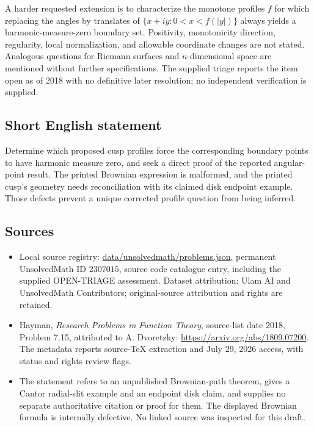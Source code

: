 \documentclass[11pt]{article}
\begin{document}
A harder requested extension is to characterize the monotone profiles $f$ for which replacing the angles by translates of $\{x+iy:0<x<f(|y|)\}$ always yields a harmonic-measure-zero boundary set. Positivity, monotonicity direction, regularity, local normalization, and allowable coordinate changes are not stated. Analogous questions for Riemann surfaces and $n$-dimensional space are mentioned without further specifications. The supplied triage reports the item open as of 2018 with no definitive later resolution; no independent verification is supplied.
\subsection{Short English statement}
Determine which proposed cusp profiles force the corresponding boundary points to have harmonic measure zero, and seek a direct proof of the reported angular-point result. The printed Brownian expression is malformed, and the printed cusp's geometry needs reconciliation with its claimed disk endpoint example. Those defects prevent a unique corrected profile question from being inferred.
\subsection{Sources}
\begin{itemize}
\item Local source registry: \url{data/unsolvedmath/problems.json}, permanent UnsolvedMath ID $2307015$, source code catalogue entry, including the supplied OPEN-TRIAGE assessment. Dataset attribution: Ulam AI and UnsolvedMath Contributors; original-source attribution and rights are retained.
\item Hayman, \emph{Research Problems in Function Theory}, source-list date 2018, Problem 7.15, attributed to A. Dvoretzky: \url{https://arxiv.org/abs/1809.07200}. The metadata reports source-TeX extraction and July 29, 2026 access, with status and rights review flags.
\item The statement refers to an unpublished Brownian-path theorem, gives a Cantor radial-slit example and an endpoint disk claim, and supplies no separate authoritative citation or proof for them. The displayed Brownian formula is internally defective. No linked source was inspected for this draft.
\end{itemize}
\end{document}
